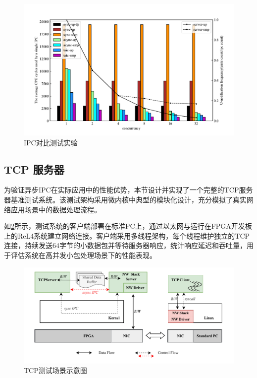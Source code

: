 \begin{figure}[htbp]
    \centering
    \includegraphics[width=1.0\textwidth]{figures/ipc_test.pdf}
    \caption{IPC对比测试实验}\label{fig:ipc_test}
\end{figure}

\subsection{TCP 服务器}

为验证异步IPC在实际应用中的性能优势，本节设计并实现了一个完整的TCP服务器基准测试系统。该测试架构采用微内核中典型的模块化设计，充分模拟了真实网络应用场景中的数据处理流程。

如\ref{fig:tcp_test}所示，测试系统的客户端部署在标准PC上，通过以太网与运行在FPGA开发板上的ReL4系统建立网络连接。客户端采用多线程架构，每个线程维护独立的TCP连接，持续发送64字节的小数据包并等待服务器响应，统计响应延迟和吞吐量，用于评估系统在高并发小包处理场景下的性能表现。

\begin{figure}[htbp]
    \centering
    \includegraphics[width=1.0\textwidth]{figures/tcp_test_framework.drawio.pdf}
    \caption{TCP测试场景示意图}\label{fig:tcp_test}
\end{figure}

